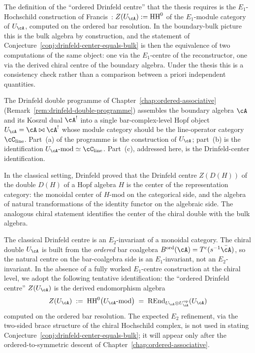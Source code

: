 The definition of the ``ordered Drinfeld centre'' that the
thesis requires is the $E_1$-Hochschild construction of
Francis~\cite{francis2013tangent}: $Z(U_\cA) := \mathrm{HH}^0$
of the $E_1$-module category of $U_\cA$, computed on the
ordered bar resolution. In the boundary-bulk picture this is
the bulk algebra by construction, and the statement of
Conjecture~\ref{conj:drinfeld-center-equals-bulk} is then the
equivalence of two computations of the same object: one via
the $E_1$-centre of the reconstructor, one via the derived
chiral centre of the boundary algebra. Under the thesis this
is a consistency check rather than a comparison between a
priori independent quantities.

The Drinfeld double programme of Chapter~\ref{chap:ordered-associative}
(Remark~\ref{rem:drinfeld-double-programme}) assembles the boundary
algebra $\cA$ and its Koszul dual $\cA^!$ into a single bar-complex-level
Hopf object $U_\cA = \cA \bowtie \cA^!$ whose module category should be
the line-operator category $\cC_{\mathrm{line}}$. Part~(a) of the
programme is the construction of $U_\cA$; part~(b) is the identification
$U_\cA\text{-mod} \simeq \cC_{\mathrm{line}}$. Part~(c), addressed here,
is the Drinfeld-center identification.

In the classical setting, Drinfeld proved that the Drinfeld centre
$Z(D(H))$ of the double $D(H)$ of a Hopf algebra $H$ is the center of
the representation category: the monoidal center of $H\text{-mod}$ on
the categorical side, and the algebra of natural transformations of the
identity functor on the algebraic side. The analogous chiral statement
identifies the center of the chiral double with the bulk algebra.

\begin{remark}
\label{rem:ordered-drinfeld-center-definition}
The classical Drinfeld centre is an $E_2$-invariant of a monoidal
category. The chiral double $U_\cA$ is built from the \emph{ordered}
bar coalgebra $B^{\mathrm{ord}}(\cA) = T^c(s^{-1}\bar\cA)$, so the
natural centre on the bar-coalgebra side is an $E_1$-invariant, not
an $E_2$-invariant. In the absence of a fully worked $E_1$-centre
construction at the chiral level, we adopt the following tentative
identification: the ``ordered Drinfeld centre'' $Z(U_\cA)$ is
the derived endomorphism algebra
\[
Z(U_\cA) \;:=\;
\mathrm{HH}^0\bigl(U_\cA\text{-mod}\bigr)
\;=\;
\mathrm{R}\!\operatorname{End}_{U_\cA\otimes U_\cA^{\mathrm{op}}}(U_\cA)
\]
computed on the ordered bar resolution. The expected $E_2$
refinement, via the two-sided brace structure of the chiral Hochschild
complex, is not used in stating
Conjecture~\ref{conj:drinfeld-center-equals-bulk}; it will appear
only after the ordered-to-symmetric descent of
Chapter~\ref{chap:ordered-associative}.
\end{remark}

